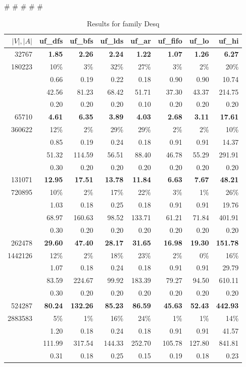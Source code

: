 
#        
#        
#        
#        
#        

\begin{table}[h]
\caption{Results for family Desq}
\begin{tabular}{|r||r|r|r|r|r|r|r|} \hline
$|V|,|A|$ & {\sc uf\_dfs} & {\sc uf\_bfs} & {\sc uf\_lds} & {\sc uf\_ar} & {\sc uf\_fifo} & {\sc uf\_lo} & {\sc uf\_hi}\\ \hline
32767 & {\bf1.85} & {\bf2.26} & {\bf2.24} & {\bf1.22} & {\bf1.07} & {\bf1.26} & {\bf6.27} \\ 
180223  & 10\%  & 3\%  & 32\%  & 27\%  & 3\%  & 2\%  & 20\% \\ 
& 0.66 & 0.19 & 0.22 & 0.18 & 0.90 & 0.90 & 10.74 \\
& 42.56 & 81.23 & 68.42 & 51.71 & 37.30 & 43.37 & 214.75 \\ 
& 0.20 & 0.20 & 0.20 & 0.10 & 0.20 & 0.20 & 0.20 \\ \hline
65710 & {\bf4.61} & {\bf6.35} & {\bf3.89} & {\bf4.03} & {\bf2.68} & {\bf3.11} & {\bf17.61} \\ 
360622  & 12\%  & 2\%  & 29\%  & 29\%  & 2\%  & 2\%  & 10\% \\ 
& 0.85 & 0.19 & 0.24 & 0.18 & 0.91 & 0.91 & 14.37 \\
& 51.32 & 114.59 & 56.51 & 88.40 & 46.78 & 55.29 & 291.91 \\ 
& 0.30 & 0.20 & 0.20 & 0.20 & 0.20 & 0.20 & 0.20 \\ \hline
131071 & {\bf12.95} & {\bf17.51} & {\bf13.78} & {\bf11.84} & {\bf6.63} & {\bf7.67} & {\bf48.21} \\ 
720895  & 10\%  & 2\%  & 17\%  & 22\%  & 3\%  & 1\%  & 26\% \\ 
& 1.03 & 0.18 & 0.25 & 0.18 & 0.91 & 0.91 & 19.76 \\
& 68.97 & 160.63 & 98.52 & 133.71 & 61.21 & 71.84 & 401.91 \\ 
& 0.30 & 0.20 & 0.20 & 0.20 & 0.20 & 0.20 & 0.20 \\ \hline
262478 & {\bf29.60} & {\bf47.40} & {\bf28.17} & {\bf31.65} & {\bf16.98} & {\bf19.30} & {\bf151.78} \\ 
1442126  & 12\%  & 2\%  & 18\%  & 23\%  & 2\%  & 0\%  & 16\% \\ 
& 1.07 & 0.18 & 0.24 & 0.18 & 0.91 & 0.91 & 29.79 \\
& 83.59 & 224.67 & 99.92 & 183.39 & 79.27 & 94.50 & 610.11 \\ 
& 0.30 & 0.20 & 0.20 & 0.20 & 0.20 & 0.20 & 0.20 \\ \hline
524287 & {\bf80.24} & {\bf132.26} & {\bf85.23} & {\bf86.59} & {\bf45.63} & {\bf52.43} & {\bf442.93} \\ 
2883583  & 5\%  & 1\%  & 16\%  & 24\%  & 1\%  & 1\%  & 14\% \\ 
& 1.20 & 0.18 & 0.24 & 0.18 & 0.91 & 0.91 & 41.57 \\
& 111.99 & 317.54 & 144.33 & 252.70 & 105.78 & 127.80 & 841.81 \\ 
& 0.31 & 0.18 & 0.25 & 0.15 & 0.19 & 0.18 & 0.23 \\ \hline
\end{tabular}
\end{table}


